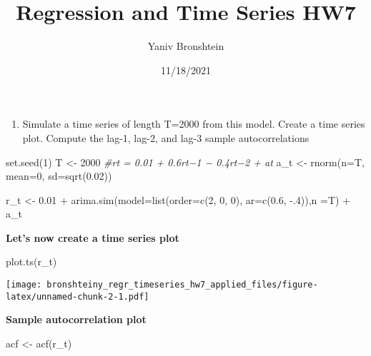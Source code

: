 \documentclass[
]{article}
\title{Regression and Time Series HW7}
\author{Yaniv Bronshtein}
\date{11/18/2021}
\newenvironment{Shaded}{\begin{snugshade}}{\end{snugshade}}
\newcommand{\AttributeTok}[1]{\textcolor[rgb]{0.77,0.63,0.00}{#1}}
\newcommand{\CommentTok}[1]{\textcolor[rgb]{0.56,0.35,0.01}{\textit{#1}}}
\newcommand{\DecValTok}[1]{\textcolor[rgb]{0.00,0.00,0.81}{#1}}
\newcommand{\FloatTok}[1]{\textcolor[rgb]{0.00,0.00,0.81}{#1}}
\newcommand{\FunctionTok}[1]{\textcolor[rgb]{0.00,0.00,0.00}{#1}}
\newcommand{\NormalTok}[1]{#1}
\newcommand{\OtherTok}[1]{\textcolor[rgb]{0.56,0.35,0.01}{#1}}
\newcommand{\SpecialCharTok}[1]{\textcolor[rgb]{0.00,0.00,0.00}{#1}}
\providecommand{\tightlist}{%
  \setlength{\itemsep}{0pt}\setlength{\parskip}{0pt}}
\begin{document}
\maketitle

\begin{enumerate}
\def\labelenumi{(\alph{enumi})}
\setcounter{enumi}{2}
\tightlist
\item
  Simulate a time series of length T=2000 from this model. Create a time
  series plot. Compute the lag-1, lag-2, and lag-3 sample
  autocorrelations
\end{enumerate}

\begin{Shaded}
\begin{Highlighting}[]
\FunctionTok{set.seed}\NormalTok{(}\DecValTok{1}\NormalTok{)}
\NormalTok{T }\OtherTok{\textless{}{-}} \DecValTok{2000}
\CommentTok{\#rt = 0.01 + 0.6rt−1 − 0.4rt−2 + at}
\NormalTok{a\_t }\OtherTok{\textless{}{-}} \FunctionTok{rnorm}\NormalTok{(}\AttributeTok{n=}\NormalTok{T, }\AttributeTok{mean=}\DecValTok{0}\NormalTok{, }\AttributeTok{sd=}\FunctionTok{sqrt}\NormalTok{(}\FloatTok{0.02}\NormalTok{))}

\NormalTok{r\_t }\OtherTok{\textless{}{-}} \FloatTok{0.01} \SpecialCharTok{+} \FunctionTok{arima.sim}\NormalTok{(}\AttributeTok{model=}\FunctionTok{list}\NormalTok{(}\AttributeTok{order=}\FunctionTok{c}\NormalTok{(}\DecValTok{2}\NormalTok{, }\DecValTok{0}\NormalTok{, }\DecValTok{0}\NormalTok{), }\AttributeTok{ar=}\FunctionTok{c}\NormalTok{(}\FloatTok{0.6}\NormalTok{, }\SpecialCharTok{{-}}\NormalTok{.}\DecValTok{4}\NormalTok{)),}\AttributeTok{n =}\NormalTok{T) }\SpecialCharTok{+}\NormalTok{ a\_t}
\end{Highlighting}
\end{Shaded}

\textbf{Let's now create a time series plot}

\begin{Shaded}
\begin{Highlighting}[]
\FunctionTok{plot.ts}\NormalTok{(r\_t)}
\end{Highlighting}
\end{Shaded}

\texttt{[image: bronshteiny\_regr\_timeseries\_hw7\_applied\_files/figure-latex/unnamed-chunk-2-1.pdf]}

\textbf{Sample autocorrelation plot}

\begin{Shaded}
\begin{Highlighting}[]
\NormalTok{acf }\OtherTok{\textless{}{-}} \FunctionTok{acf}\NormalTok{(r\_t)}
\end{Highlighting}
\end{Shaded}
\end{document}
